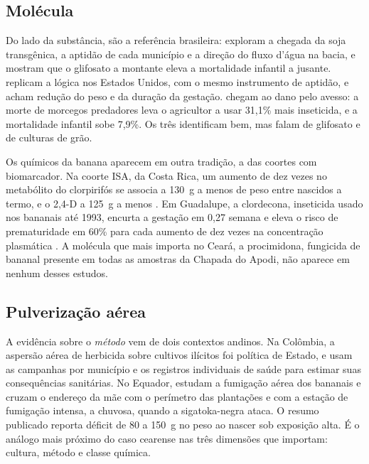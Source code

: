 \subsection{Molécula}

Do lado da substância, \citet{dias2023down} são a referência brasileira:
exploram a chegada da soja transgênica, a aptidão de cada município e a direção
do fluxo d'água na bacia, e mostram que o glifosato a montante eleva a
mortalidade infantil a jusante. \citet{reynier2025glyphosate} replicam a lógica
nos Estados Unidos, com o mesmo instrumento de aptidão, e acham redução do peso
e da duração da gestação. \citet{frank2024ecosystem} chegam ao dano pelo
avesso: a morte de morcegos predadores leva o agricultor a usar 31,1\% mais
inseticida, e a mortalidade infantil sobe 7,9\%. Os três identificam bem, mas
falam de glifosato e de culturas de grão.

Os químicos da banana aparecem em outra tradição, a das coortes com
biomarcador. Na coorte ISA, da Costa Rica, um aumento de dez vezes no metabólito
do clorpirifós se associa a 130~g a menos de peso entre nascidos a termo, e o
2,4-D a 125~g a menos \citep{vanwendel2024isa}. Em Guadalupe, a clordecona,
inseticida usado nos bananais até 1993, encurta a gestação em 0,27 semana e
eleva o risco de prematuridade em 60\% para cada aumento de dez vezes na
concentração plasmática \citep{kadhel2014chlordecone}. A molécula que mais
importa no Ceará, a procimidona, fungicida de bananal presente em todas as
amostras da Chapada do Apodi, não aparece em nenhum desses estudos.

\subsection{Pulverização aérea}

A evidência sobre o \emph{método} vem de dois contextos andinos. Na Colômbia, a
aspersão aérea de herbicida sobre cultivos ilícitos foi política de Estado, e
\citet{camacho2017health} usam as campanhas por município e os registros
individuais de saúde para estimar suas consequências sanitárias. No Equador,
\citet{calzada2023bananas} estudam a fumigação aérea dos bananais e cruzam o
endereço da mãe com o perímetro das plantações e com a estação de fumigação
intensa, a chuvosa, quando a sigatoka-negra ataca. O resumo publicado reporta
déficit de 80 a 150~g no peso ao nascer sob exposição alta. É o análogo mais
próximo do caso cearense nas três dimensões que importam: cultura, método e
classe química.

